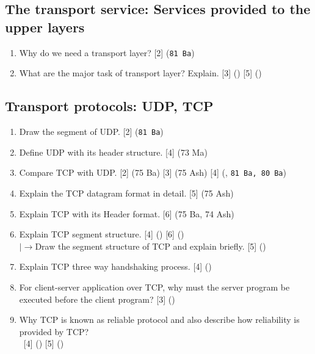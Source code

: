 \documentclass[12pt]{article}
\newcommand{\lb}{\\$\left|\rightarrow\right.$}
\newcommand{\enter}{\\\textcolor{white}{1}}
\begin{document}
	\subsection{The transport service: Services provided to the upper layers}
		\begin{enumerate}[noitemsep, topsep=0pt]
			\item Why do we need a transport layer? \hfill [2] (\texttt{81 Ba})

			\item What are the major task of transport layer? Explain. \hfill [3] () [5] ()
		\end{enumerate}

	\subsection{Transport protocols: UDP, TCP}
		\begin{enumerate}[noitemsep, topsep=0pt]
			\item Draw the segment of UDP. \hfill [2] (\texttt{81 Ba})

			\item Define UDP with its header structure. \hfill [4] (73 Ma)

			\item Compare TCP with UDP. \hfill [2] (75 Ba) [3] (75 Ash) [4] (, \texttt{81 Ba, 80 Ba})

			\item Explain the TCP datagram format in detail. \hfill [5] (75 Ash)

			\item Explain TCP with its Header format. \hfill [6] (75 Ba, 74 Ash)

			\item Explain TCP segment structure. \hfill [4] () [6] ()
			\lb Draw the segment structure of TCP and explain briefly. \hfill [5] ()

			\item Explain TCP three way handshaking process. \hfill [4] ()

			\item For client-server application over TCP, why must the server program be executed before the client program? \hfill [3] ()

			\item Why TCP is known as reliable protocol and also describe how reliability is provided by TCP?
			\enter\hfill [4] () [5] ()
		\end{enumerate}
\end{document}
